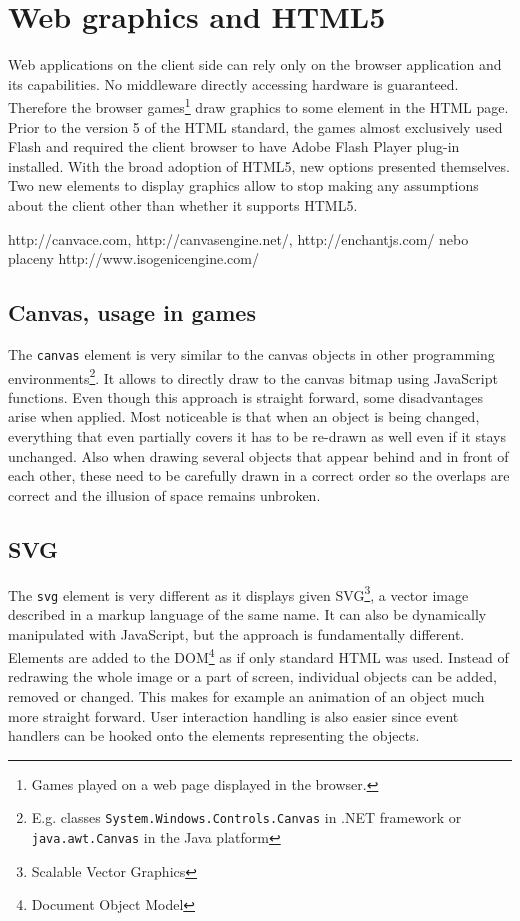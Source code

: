 \documentclass[11pt,oneside, final]{fithesis2}
\begin{document}
\section{Web graphics and HTML5}
Web applications on the client side can rely only on the browser application and its capabilities. No middleware directly accessing hardware is guaranteed. Therefore the browser games\footnote{Games played on a web page displayed in the browser.} draw graphics to some element in the HTML page. Prior to the version 5 of the HTML standard, the games almost exclusively used Flash and required the client browser to have Adobe Flash Player plug-in installed\cite{flashplayer}. With the broad adoption of HTML5, new options presented themselves. Two new elements to display graphics allow to stop making any assumptions about the client other than whether it supports HTML5.

http://canvace.com, http://canvasengine.net/, http://enchantjs.com/ nebo placeny http://www.isogenicengine.com/


\subsection{Canvas, usage in games}
The \texttt{canvas} element is very similar to the canvas objects in other programming environments\footnote{E.g. classes \texttt{System.Windows.Controls.Canvas} in .NET framework\cite{net_canvas} or \texttt{java.awt.Canvas} in the Java platform\cite{java_canvas}}. It allows to directly draw to the canvas bitmap using JavaScript functions. Even though this approach is straight forward, some disadvantages arise when applied. Most noticeable is that when an object is being changed, everything that even partially covers it has to be re-drawn as well even if it stays unchanged. Also when drawing several objects that appear behind and in front of each other, these need to be carefully drawn in a correct order so the overlaps are correct and the illusion of space remains unbroken.

\subsection{SVG}
The \texttt{svg} element is very different as it displays given SVG\footnote{Scalable Vector Graphics}, a vector image described in a markup language of the same name. It can also be dynamically manipulated with JavaScript, but the approach is fundamentally different. Elements are added to the DOM\footnote{Document Object Model} as if only standard HTML was used. Instead of redrawing the whole image or a part of screen, individual objects can be added, removed or changed. This makes for example an animation of an object much more straight forward. User interaction handling is also easier since event handlers can be hooked onto the elements representing the objects.
\end{document}
